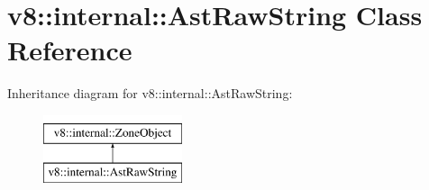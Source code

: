 \hypertarget{classv8_1_1internal_1_1AstRawString}{}\section{v8\+:\+:internal\+:\+:Ast\+Raw\+String Class Reference}
\label{classv8_1_1internal_1_1AstRawString}
Inheritance diagram for v8\+:\+:internal\+:\+:Ast\+Raw\+String\+:\begin{figure}[H]
\begin{center}
\leavevmode
\includegraphics[height=2.000000cm]{classv8_1_1internal_1_1AstRawString}
\end{center}
\end{figure}
